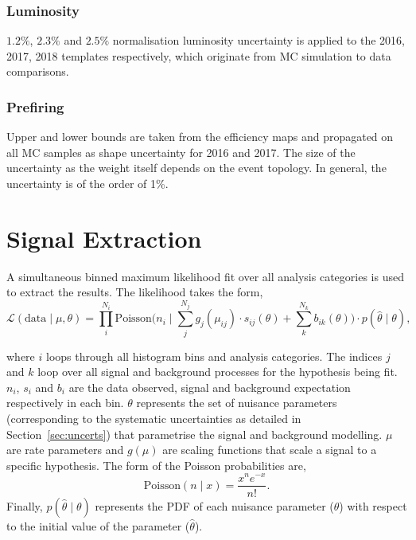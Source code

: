 \subsubsection{Luminosity}
$1.2\%$, $2.3\%$ and $2.5\%$ normalisation luminosity uncertainty is applied to the 2016, 2017, 2018 templates respectively, which originate from MC simulation to data comparisons.

\subsubsection{Prefiring}
Upper and lower bounds are taken from the efficiency maps and propagated on all \ac{MC} samples as shape uncertainty for 2016 and 2017.
The size of the uncertainty as the weight itself depends on the event topology. 
In general, the uncertainty is of the order of 1\%.

\section{Signal Extraction}
\label{sec:sig_ext}

A simultaneous binned maximum likelihood fit over all analysis categories is used to extract the results.
The likelihood takes the form,
\begin{equation}
\mathcal{L}(\text{data}\mid\mu,\theta) = \prod_{i}^{N_{i}} \text{Poisson} \Big(n_{i} \mid \sum_{j}^{N_{j}} g_{j}(\mu_{ij}) \cdot s_{ij}(\theta) + \sum_{k}^{N_{k}} b_{ik}(\theta)\Big) \cdot p(\hat{\theta} \mid \theta),
\label{eqn:likelihood}
\end{equation}

where $i$ loops through all histogram bins and analysis categories.
The indices $j$ and $k$ loop over all signal and background processes for the hypothesis being fit.
$n_i$, $s_i$ and $b_i$ are the data observed, signal and background expectation respectively in each bin.
$\theta$ represents the set of nuisance parameters (corresponding to the systematic uncertainties as detailed in Section~\ref{sec:uncerts}) that parametrise the signal and background modelling.
$\mu$ are rate parameters and $g(\mu)$ are scaling functions that scale a signal to a specific hypothesis.
The form of the Poisson probabilities are,
\begin{equation}
\text{Poisson} (n \mid x) = \frac{x^{n}e^{-x}}{n!}.
\end{equation}
Finally, $p(\hat{\theta} \mid \theta)$ represents the \ac{PDF} of each nuisance parameter ($\theta$) with respect to the initial value of the parameter ($\hat{\theta}$). \\

